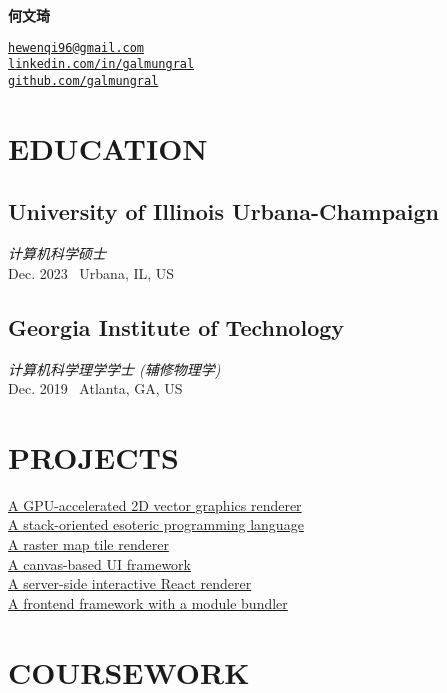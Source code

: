 \documentclass[11pt,twocolumn]{article}
\begin{document}
{\Huge\bf 何文琦}

\vspace{10pt}
\href{mailto:hewenqi96@gmail.com}{\texttt{hewenqi96@gmail.com}}\\
\href{https://linkedin.com/in/galmungral}{\texttt{linkedin.com/in/galmungral}}\\
\href{https://github.com/galmungral}{\texttt{github.com/galmungral}}


\section*{\textnormal{EDUCATION}}

\subsection*{University of Illinois Urbana-Champaign}
\textit{计算机科学硕士}\\
Dec. 2023 \textbullet\ Urbana, IL, US

\subsection*{Georgia Institute of Technology}
\textit{计算机科学理学学士 (辅修物理学)}\\
Dec. 2019 \textbullet\ Atlanta, GA, US

\section*{\textnormal{PROJECTS}}
\href{https://github.com/galmungral/polyrender}{A GPU-accelerated 2D vector graphics renderer}\\
\href{https://github.com/galmungral/hanbun-lang}{A stack-oriented esoteric programming language} \\
\href{https://github.com/galmungral/mercator}{A raster map tile renderer}\\
\href{https://github.com/galmungral/michelangelo}{A canvas-based UI framework}\\
\href{https://github.com/galmungral/react-teletype}{A server-side interactive React renderer} \\
\href{https://github.com/galmungral/replay}{A frontend framework with a module bundler}

\section*{\textnormal{COURSEWORK}}
\end{document}

